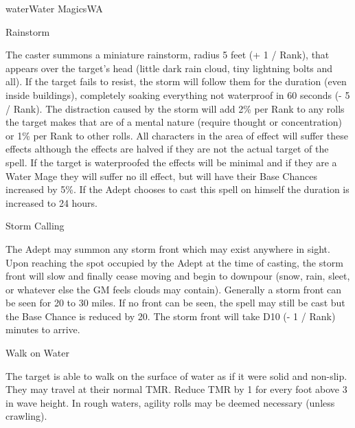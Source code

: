 \begin{college}[1.3]{water}{Water Magics}{WA}
\begin{spell}[S-8]{Rainstorm}
\begin{effects}
The caster summons a miniature rainstorm, radius 5 feet (+ 1 / Rank),
that appears over the target's head (little dark rain cloud, tiny
lightning bolts and all). If the target fails to resist, the storm
will follow them for the duration (even inside buildings), completely
soaking everything not waterproof in 60 seconds (- 5 / Rank). The
distraction caused by the storm will add 2\% per Rank to any rolls the
target makes that are of a mental nature (\ie require thought or
concentration) or 1\% per Rank to other rolls. All characters in the
area of effect will suffer these effects although the effects are
halved if they are not the actual target of the spell. If the target
is waterproofed the effects will be minimal and if they are a Water
Mage they will suffer no ill effect, but will have their Base Chances
increased by 5\%. If the Adept chooses to cast this spell on himself
the duration is increased to 24 hours.
\end{effects}
\end{spell}

\begin{spell}[S-9]{Storm Calling}

\begin{effects}
The Adept may summon any storm front which may exist anywhere in
sight. Upon reaching the spot occupied by the Adept at the time of
casting, the storm front will slow and finally cease moving and begin
to downpour (snow, rain, sleet, or whatever else the GM feels clouds
may contain). Generally a storm front can be seen for 20 to 30
miles. If no front can be seen, the spell may still be cast but the
Base Chance is reduced by 20. The storm front will take D10  (- 1
/ Rank) minutes to arrive.
\end{effects}
\end{spell}

\begin{spell}[S-10]{Walk on Water}

\begin{effects}
The target is able to walk on the surface of water as if it were solid
and non-slip. They may travel at their normal TMR. Reduce TMR by 1 for
every foot above 3 in wave height. In rough waters, agility rolls may
be deemed necessary (unless crawling).
\end{effects}
\end{spell}


\end{college}
